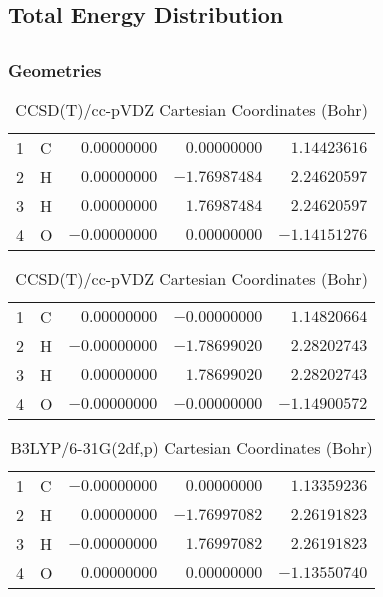 \documentclass[10pt,oneside]{article}
\begin{document}
\begin{table}
\subsection*{Total Energy Distribution}
\centering\end{table}

\clearpage

\subsection{}

\begin{table}[h!]
\subsubsection*{Geometries}
\begin{multicols}{2}
\centering
\caption{CCSD(T)/cc-pVTZ Cartesian Coordinates (Bohr)}
\begin{tabular}{llrrr}
\toprule
1  & C  & $ 0.00000000$ & $ 0.00000000$ & $ 1.14423616$ \\
2  & H  & $ 0.00000000$ & $-1.76987484$ & $ 2.24620597$ \\
3  & H  & $ 0.00000000$ & $ 1.76987484$ & $ 2.24620597$ \\
4  & O  & $-0.00000000$ & $ 0.00000000$ & $-1.14151276$ \\
\bottomrule
\end{tabular}
\caption{CCSD(T)/cc-pVDZ Cartesian Coordinates (Bohr)}
\begin{tabular}{llrrr}
\toprule
1  & C  & $ 0.00000000$ & $-0.00000000$ & $ 1.14820664$ \\
2  & H  & $-0.00000000$ & $-1.78699020$ & $ 2.28202743$ \\
3  & H  & $ 0.00000000$ & $ 1.78699020$ & $ 2.28202743$ \\
4  & O  & $-0.00000000$ & $-0.00000000$ & $-1.14900572$ \\
\bottomrule
\end{tabular}
\end{multicols}
\end{table}

\begin{table}[h]
\centering
\caption{B3LYP/6-31G(2df,p) Cartesian Coordinates (Bohr)}
\begin{tabular}{llrrr}
\toprule
1  & C  & $-0.00000000$ & $ 0.00000000$ & $ 1.13359236$ \\
2  & H  & $ 0.00000000$ & $-1.76997082$ & $ 2.26191823$ \\
3  & H  & $-0.00000000$ & $ 1.76997082$ & $ 2.26191823$ \\
4  & O  & $ 0.00000000$ & $ 0.00000000$ & $-1.13550740$ \\
\bottomrule
\end{tabular}
\end{table}
\end{document}
